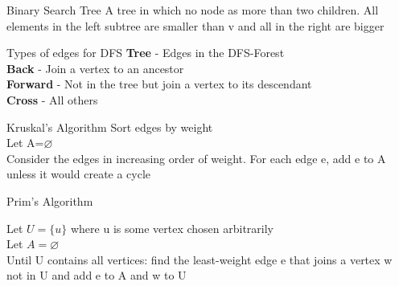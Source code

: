 \documentclass[grid,avery5371]{flashcards}
\begin{document}
\begin{flashcard}[]{Binary Search Tree}
	A tree in which no node as more than two children. All elements in the left subtree are smaller than v and all in the right are bigger
\end{flashcard}

\begin{flashcard}[]{Types of edges for DFS}	{\small
	\textbf{Tree} - Edges in the DFS-Forest\\
	\textbf{Back} - Join a vertex to an ancestor\\
	\textbf{Forward} - Not in the tree but join a vertex to its descendant\\
	\textbf{Cross} - All others}
\end{flashcard}

\begin{flashcard}[]{Kruskal's Algorithm}
	{\small
Sort edges by weight\\
Let A=$\varnothing$\\
Consider the edges in increasing order of weight. For each edge e, add e to A unless it would create a cycle}
\end{flashcard}

\begin{flashcard}[]{Prim's Algorithm}
{\small
Let $U=\{u\}$ where u is some vertex chosen arbitrarily\\
Let $A=\varnothing$\\
Until U contains all vertices: find the least-weight edge e that joins a vertex w not in U and add e to A and w to U


}
\end{flashcard}
\end{document}
